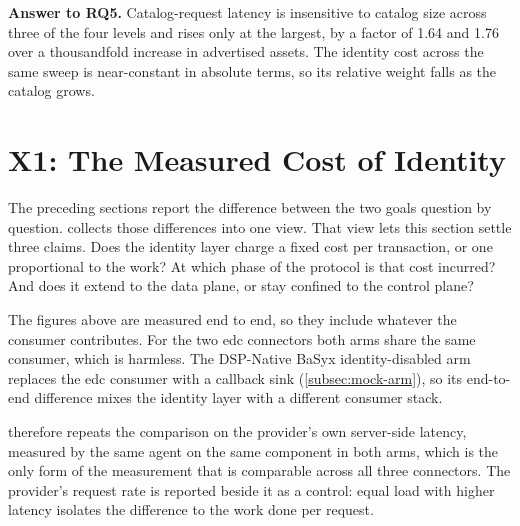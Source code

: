\textbf{Answer to RQ5.} Catalog-request latency is insensitive to catalog size across three of the four levels and rises only at the largest, by a factor of 1.64 and 1.76 over a thousandfold increase in advertised assets. The identity cost across the same sweep is near-constant in absolute terms, so its relative weight falls as the catalog grows.

\section{X1: The Measured Cost of Identity}\label{sec:x1-overhead}


The preceding sections report the difference between the two goals question by question.  collects those differences into one view. That view lets this section settle three claims. Does the identity layer charge a fixed cost per transaction, or one proportional to the work? At which phase of the protocol is that cost incurred? And does it extend to the data plane, or stay confined to the control plane?

\begin{table}[H]
    \centering
    \begin{threeparttable}
    \small
    \setlength{\tabcolsep}{5pt}
    \small
    \setlength{\tabcolsep}{4pt}
    
    \end{threeparttable}
    \caption[Identity overhead per connector and metric]{Identity overhead X1 per connector and metric, as the difference between the identity-enabled and identity-disabled goals.}
    \label{tab:x1-overhead}
\end{table}

The figures above are measured end to end, so they include whatever the consumer
contributes. For the two \gls{edc} connectors both arms share the same consumer, which is harmless. The DSP-Native BaSyx identity-disabled arm replaces the \gls{edc} consumer with a callback sink (\cref{subsec:mock-arm}), so its end-to-end difference mixes the identity layer with a different consumer stack.

 therefore repeats the comparison on the provider's own server-side latency, measured by
the same agent on the same component in both arms, which is the only form of the
measurement that is comparable across all three connectors. The provider's request rate
is reported beside it as a control: equal load with higher latency isolates the
difference to the work done per request.

